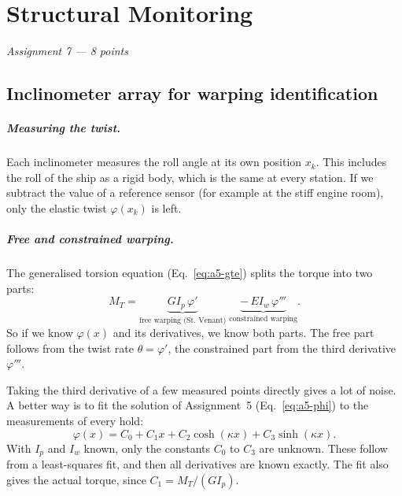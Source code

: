 \chapter{Structural Monitoring}
\label{ch:assignment7}

\begingroup\itshape Assignment 7 --- 8 points\endgroup


\section{Inclinometer array for warping identification}
\label{sec:a7-1}


\paragraph{Measuring the twist.} Each inclinometer measures the roll angle at its own position $x_k$. This includes the roll of the ship as a rigid body, which is the same at every station. If we subtract the value of a reference sensor (for example at the stiff engine room), only the elastic twist $\varphi(x_k)$ is left.

\paragraph{Free and constrained warping.} The generalised torsion equation (Eq.~\ref{eq:a5-gte}) splits the torque into two parts:
\begin{equation}
  M_T = \underbrace{G I_p\,\varphi'}_{\text{free warping (St.\ Venant)}} \;\underbrace{-\,E I_w\,\varphi'''}_{\text{constrained warping}} .
  \label{eq:a7-split}
\end{equation}
So if we know $\varphi(x)$ and its derivatives, we know both parts. The free part follows from the twist rate $\theta = \varphi'$, the constrained part from the third derivative $\varphi'''$.

Taking the third derivative of a few measured points directly gives a lot of noise. A better way is to fit the solution of Assignment~5 (Eq.~\ref{eq:a5-phi}) to the measurements of every hold:
\begin{equation}
  \varphi(x) = C_0 + C_1 x + C_2\cosh(\kappa x) + C_3\sinh(\kappa x).
\end{equation}
With $I_p$ and $I_w$ known, only the constants $C_0$ to $C_3$ are unknown. These follow from a least-squares fit, and then all derivatives are known exactly. The fit also gives the actual torque, since $C_1 = M_T/(GI_p)$.

